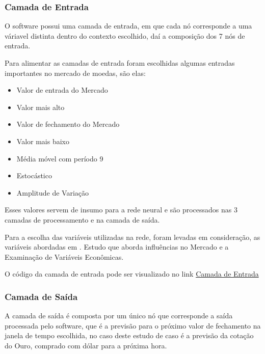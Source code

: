 \pagebreak

\subsubsection[Camada de Entrada]{Camada de Entrada}

O software possui uma camada de entrada, em que cada nó corresponde a uma váriavel distinta dentro do contexto escolhido, daí
a composição dos 7 nós de entrada.

Para alimentar as camadas de entrada foram escolhidas algumas entradas importantes no mercado de moedas, são elas:

\begin{itemize}
  \item Valor de entrada do Mercado
  \item Valor mais alto
  \item Valor de fechamento do Mercado
  \item Valor mais baixo
  \item Média móvel com período 9
  \item Estocástico
  \item Amplitude de Variação
\end{itemize}

Esses valores servem de insumo para a rede neural e são processados nas 3 camadas de processamento e na camada de saída.

Para a escolha das variáveis utilizadas na rede, foram levadas em consideração, as variáveis abordadas em \cite{tau}.
Estudo que aborda influências no Mercado e a Examinação de Variáveis Econômicas. 

O código da camada de entrada pode ser visualizado no link  \href{https://github.com/matmello/brainbot/tree/master/input}{Camada de Entrada}


\subsubsection[Camada de Saída]{Camada de Saída}

A camada de saída é composta por um único nó que corresponde a saída processada pelo software, que é a previsão para o próximo valor
de fechamento na janela de tempo escolhida, no caso deste estudo de caso é a previsão da cotação do Ouro, comprado com dólar para a
próxima hora.

